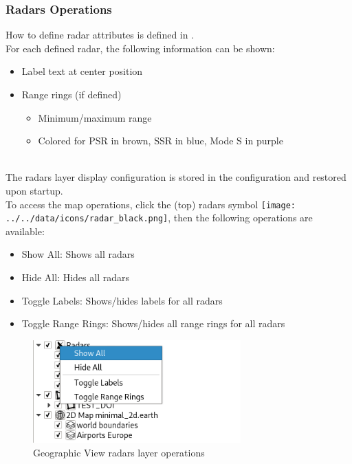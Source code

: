 \subsubsection{Radars Operations}
\label{sec:geo_radars_ops} 

How to define radar attributes is defined in . \\

For each defined radar, the following information can be shown:

\begin{itemize}
 \item Label text at center position
 \item Range rings (if defined)
\begin{itemize}
 \item Minimum/maximum range
 \item Colored for PSR in brown, SSR in blue, Mode S in purple
\end{itemize} 
\end{itemize} 
\ \\

The radars layer display configuration is stored in the configuration and restored upon startup. \\

To access the map operations, click the (top) radars symbol \texttt{[image: ../../data/icons/radar\_black.png]}, then the following operations are available:

\begin{itemize}
 \item Show All: Shows all radars
 \item Hide All: Hides all radars
 \item Toggle Labels: Shows/hides labels for all radars
 \item Toggle Range Rings: Shows/hides all range rings for all radars
\end{itemize} 

\begin{figure}[H]
    \includegraphics[width=8cm,frame]{figures/geoview_radars_ops.png}
  \caption{Geographic View radars layer operations}
\end{figure}
